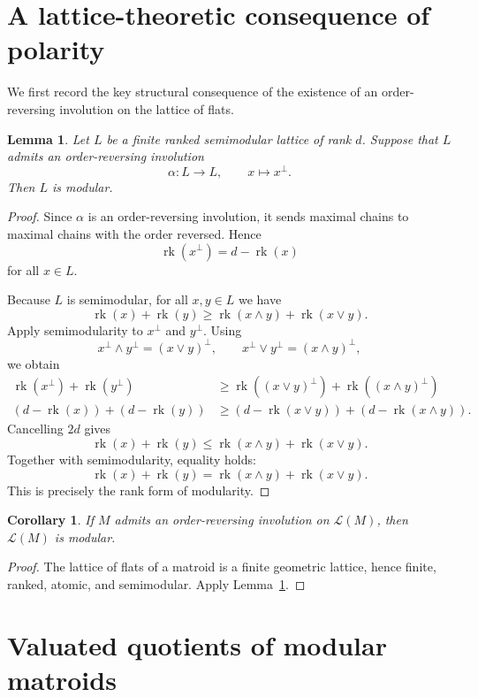 \documentclass[11pt]{article}
\newcommand{\rk}{\operatorname{rk}}
\newcommand{\cL}{\mathcal L}
\theoremstyle{plain}
\newtheorem{lemma}[theorem]{Lemma}
\newtheorem{corollary}[theorem]{Corollary}
\theoremstyle{definition}
\begin{document}
\section{A lattice-theoretic consequence of polarity}

We first record the key structural consequence of the existence of an order-reversing involution on the lattice of flats.

\begin{lemma}\label{lem:selfdual-implies-modular}
Let \(L\) be a finite ranked semimodular lattice of rank \(d\).  Suppose that \(L\) admits an order-reversing involution
\[
   \alpha:L\longrightarrow L,\qquad x\longmapsto x^\perp .
\]
Then \(L\) is modular.
\end{lemma}

\begin{proof}
Since \(\alpha\) is an order-reversing involution, it sends maximal chains to maximal chains with the order reversed.  Hence
\[
   \rk(x^\perp)=d-\rk(x)
\]
for all \(x\in L\).

Because \(L\) is semimodular, for all \(x,y\in L\) we have
\[
   \rk(x)+\rk(y)\ge \rk(x\wedge y)+\rk(x\vee y).
\]
Apply semimodularity to \(x^\perp\) and \(y^\perp\).  Using
\[
   x^\perp\wedge y^\perp=(x\vee y)^\perp,
   \qquad
   x^\perp\vee y^\perp=(x\wedge y)^\perp,
\]
we obtain
\[
\begin{aligned}
  \rk(x^\perp)+\rk(y^\perp)
  &\ge
  \rk((x\vee y)^\perp)+\rk((x\wedge y)^\perp)\\
  (d-\rk(x))+(d-\rk(y))
  &\ge
  (d-\rk(x\vee y))+(d-\rk(x\wedge y)).
\end{aligned}
\]
Cancelling \(2d\) gives
\[
   \rk(x)+\rk(y)\le \rk(x\wedge y)+\rk(x\vee y).
\]
Together with semimodularity, equality holds:
\[
   \rk(x)+\rk(y)=\rk(x\wedge y)+\rk(x\vee y).
\]
This is precisely the rank form of modularity.
\end{proof}

\begin{corollary}\label{cor:M-modular}
If \(M\) admits an order-reversing involution on \(\cL(M)\), then \(\cL(M)\) is modular.
\end{corollary}

\begin{proof}
The lattice of flats of a matroid is a finite geometric lattice, hence finite, ranked, atomic, and semimodular.  Apply Lemma~\ref{lem:selfdual-implies-modular}.
\end{proof}

\section{Valuated quotients of modular matroids}
\end{document}
